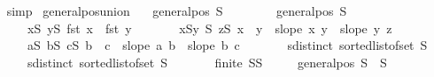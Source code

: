 \begin{isabellebody}
\ {}{}\ \isamarkupfalse%
\ simp\isanewline
{}\isamarkupfalse%
%
\endisatagproof
{\isafoldproof}%
%
\isadelimproof
\isanewline
%
\endisadelimproof
\isanewline
{}\isamarkupfalse%
\ general{\isacharunderscore}{\kern0pt}pos{\isacharunderscore}{\kern0pt}union{\isacharcolon}{\kern0pt}\isanewline
\ \ \ {\isachardoublequoteopen}general{\isacharunderscore}{\kern0pt}pos\ S{}{\isachardoublequoteclose}\ \isanewline
\ \ \ \ \ \ \ {\isachardoublequoteopen}general{\isacharunderscore}{\kern0pt}pos\ S{}{\isachardoublequoteclose}\isanewline
\ \ \ \ \ \ \ {\isachardoublequoteopen}{\isasymforall}x{\isasymin}S{}{\isachardot}{\kern0pt}\ {\isasymforall}y{\isasymin}S{}{\isachardot}{\kern0pt}\ fst\ x\ {\isacharless}{\kern0pt}\ fst\ y{\isachardoublequoteclose}\isanewline
\ \ \ \ \ \ \ {\isachardoublequoteopen}{\isasymforall}x{\isasymin}S{}{\isachardot}{\kern0pt}{\isasymforall}y{\isasymin}\ S{}{\isachardot}{\kern0pt}\ {\isasymforall}z{\isasymin}S{}{\isachardot}{\kern0pt}\ x\ {\isacharless}{\kern0pt}\ y\ {\isasymlongrightarrow}\ slope\ x\ y\ {\isacharless}{\kern0pt}\ slope\ y\ z{\isachardoublequoteclose}\isanewline
\ \ \ \ \ \ \ {\isachardoublequoteopen}{\isasymforall}a{\isasymin}S{}{\isachardot}{\kern0pt}\ {\isasymforall}b{\isasymin}S{}{\isachardot}{\kern0pt}\ {\isasymforall}c{\isasymin}S{}{\isachardot}{\kern0pt}\ b\ {\isacharless}{\kern0pt}\ c\ {\isasymlongrightarrow}\ slope\ a\ b\ {\isachargreater}{\kern0pt}\ slope\ b\ c{\isachardoublequoteclose}\isanewline
\ \ \ \ \ \ \ {\isachardoublequoteopen}sdistinct\ {\isacharparenleft}{\kern0pt}sorted{\isacharunderscore}{\kern0pt}list{\isacharunderscore}{\kern0pt}of{\isacharunderscore}{\kern0pt}set\ S{}{\isacharparenright}{\kern0pt}{\isachardoublequoteclose}\isanewline
\ \ \ \ \ \ \ {\isachardoublequoteopen}sdistinct\ {\isacharparenleft}{\kern0pt}sorted{\isacharunderscore}{\kern0pt}list{\isacharunderscore}{\kern0pt}of{\isacharunderscore}{\kern0pt}set\ S{}{\isacharparenright}{\kern0pt}{\isachardoublequoteclose}\isanewline
\ \ \ \ \ \ \ {\isachardoublequoteopen}finite\ {\isacharparenleft}{\kern0pt}S{}{\isasymunion}S{}{\isacharparenright}{\kern0pt}{\isachardoublequoteclose}\isanewline
\ \ \ \ \ {\isachardoublequoteopen}general{\isacharunderscore}{\kern0pt}pos\ {\isacharparenleft}{\kern0pt}S{}\ {\isasymunion}\ S{}{\isacharparenright}{\kern0pt}{\isachardoublequoteclose}\isanewline

\end{isabellebody}
